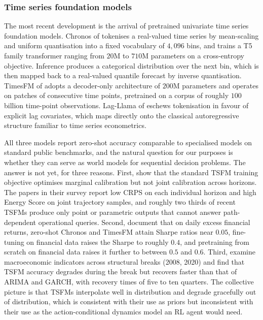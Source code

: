 \subsubsection{Time series foundation models}
\label{sec:tsfm}

The most recent development is the arrival of pretrained univariate time series
foundation models. Chronos of \citet{Ansari2024} tokenises a real-valued time series
by mean-scaling and uniform quantisation into a fixed vocabulary of $4{,}096$ bins,
and trains a T5 family transformer ranging from $20$M to $710$M parameters on a
cross-entropy objective. Inference produces a categorical distribution over the
next bin, which is then mapped back to a real-valued quantile forecast by inverse
quantisation. TimesFM of \citet{Das2024} adopts a decoder-only architecture of $200$M
parameters and operates on patches of consecutive time points, pretrained on a
corpus of roughly $100$ billion time-point observations. Lag-Llama of
\citet{Rasul2023} eschews tokenisation in favour of explicit lag covariates, which
maps directly onto the classical autoregressive structure familiar to time series
econometrics.

All three models report zero-shot accuracy comparable to specialised models on
standard public benchmarks, and the natural question for our purposes is whether
they can serve as world models for sequential decision problems. The answer is
not yet, for three reasons. First, \citet{PerezDiaz2025} show that the standard
TSFM training objective optimises marginal calibration but not joint calibration
across horizons. The papers in their survey report low CRPS on each individual
horizon and high Energy Score on joint trajectory samples, and roughly two thirds
of recent TSFMs produce only point or parametric outputs that cannot answer
path-dependent operational queries. Second, \citet{Rahimikia2025} document that
on daily excess financial returns, zero-shot Chronos and TimesFM attain Sharpe
ratios near $0.05$, fine-tuning on financial data raises the Sharpe to roughly
$0.4$, and pretraining from scratch on financial data raises it further to between
$0.5$ and $0.6$. Third, \citet{Jetwiriyanon2025} examine macroeconomic indicators
across structural breaks (2008, 2020) and find that TSFM accuracy degrades during
the break but recovers faster than that of ARIMA and GARCH, with recovery times
of five to ten quarters. The collective picture is that TSFMs interpolate well in
distribution and degrade gracefully out of distribution, which is consistent with
their use as priors but inconsistent with their use as the action-conditional
dynamics model an RL agent would need.

